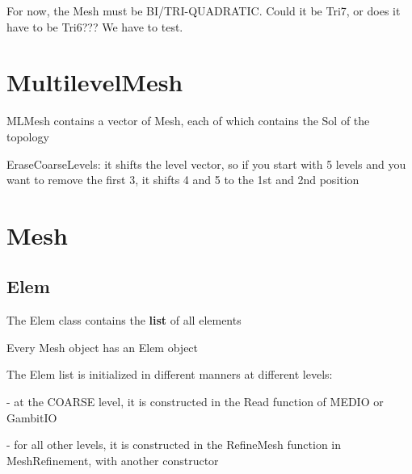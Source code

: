 \documentclass[10pt]{book}
\begin{document}
 For now, the Mesh must be BI/TRI-QUADRATIC. Could it be Tri7, or does it have to be Tri6??? We have to test.
 
 
   
     \section{MultilevelMesh}
   
   

     MLMesh  contains a vector of Mesh, each of which contains the Sol of the topology


   
  EraseCoarseLevels: it shifts the level vector, 
   so if you start with 5 levels and you want to remove the first 3,
   it shifts 4 and 5 to the 1st and 2nd position 
   
   \section{Mesh}
   
  
   \subsection{Elem}
  
  The Elem class contains the \textbf{list} of all elements
  
  Every Mesh object has an Elem object
  
  The Elem list is initialized in different manners at different levels:
  
  - at the COARSE level, it is constructed in the Read function of MEDIO or GambitIO
  
  - for all other levels, it is constructed in the RefineMesh function in MeshRefinement, with another constructor
  
  
  
  
  
\end{document}
